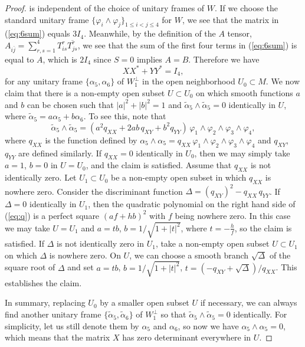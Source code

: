 \documentclass{amsart}
\begin{document}
\begin{proof}
is independent of the choice of unitary frames of $W$. If we choose the standard unitary frame $\{ \varphi_i\wedge \varphi_j\}_{1\leq i<j\leq 4}$ for $W$, we see that the matrix in (\ref{eq:6sum}) equals $3I_4$. Meanwhile, by the definition of the $A$ tensor, $A_{i\bar{j}} =\sum_{r,s=1}^4 T^r_{is} \overline{T^r_{js}}$, we see that the sum of the first four terms in (\ref{eq:6sum}) is equal to $A$, which is $2I_4$ since $S=0$ implies $A=B$. Therefore we have
\begin{equation} \label{eq:XY}
XX^{\ast}+YY^{\ast} = I_4,
\end{equation}
for any unitary frame $\{\alpha_5, \alpha_6\}$ of $W_1^{\perp}$ in the open neighborhood $U_0\subset M$. We now claim that there is a non-empty open subset $U\subset U_0$ on which smooth functions $a$ and $b$ can be chosen such that $|a|^2+|b|^2=1$ and $\tilde{\alpha}_5\wedge \tilde{\alpha}_5=0$ identically in $U$, where $\tilde{\alpha}_5 = a\alpha_5 +b\alpha_6$. To see this, note that
\begin{equation} \label{eq:q}
 \tilde{\alpha}_5\wedge \tilde{\alpha}_5 = (a^2 q_{X\!X} + 2ab \,q_{X\!Y} + b^2q_{YY})\,\varphi_1\wedge \varphi_2\wedge \varphi_3\wedge \varphi_4,
 \end{equation}
where $q_{X\!X}$ is the function defined by $\alpha_5\wedge \alpha_5 = q_{X\!X}\,\varphi_1\wedge \varphi_2\wedge \varphi_3\wedge \varphi_4$ and $q_{X\!Y}$, $q_{YY}$ are defined similarly. If $q_{X\!X}=0$ identically in $U_0$, then we may simply take $a=1$, $b=0$ in $U=U_0$, and the claim is satisfied. Assume that $q_{X\!X}$ is not identically zero. Let $U_1\subset U_0$ be a non-empty open subset in which $q_{X\!X}$ is nowhere zero. Consider the discriminant function $\Delta = (q_{X\!Y})^2- q_{X\!X} \,q_{YY}$. If $\Delta=0$ identically in $U_1$, then the quadratic polynomial on the right hand side of (\ref{eq:q}) is a perfect square $(af+hb)^2$ with $f$ being nowhere zero. In this case we may take $U=U_1$ and $a=tb$, $b=1/\sqrt{1+|t|^2}$, where $t=-\frac{h}{f}$, so the claim is satisfied. If $\Delta$ is not identically zero in $U_1$, take a non-empty open subset $U\subset U_1$ on which $\Delta$ is nowhere zero. On $U$, we can choose a smooth branch $\sqrt{\Delta}$ of the square root of $\Delta$ and set $a=tb$, $b=1/\sqrt{1+|t|^2}$, $t=(-q_{X\!Y}+\sqrt{\Delta})/q_{X\!X}$. This establishes the claim.

In summary, replacing $U_0$ by a smaller open subset $U$ if necessary, we can always find another unitary frame $\{ \tilde{\alpha}_5, \tilde{\alpha}_6\}$ of $W_1^{\perp}$ so that $ \tilde{\alpha}_5\wedge  \tilde{\alpha}_5=0$ identically. For simplicity, let us still denote them by $\alpha_5$ and $\alpha_6$, so now we have $\alpha_5\wedge  \alpha_5=0$, which means that the matrix $X$ has zero determinant everywhere in $U$.


\end{proof}
\end{document}
